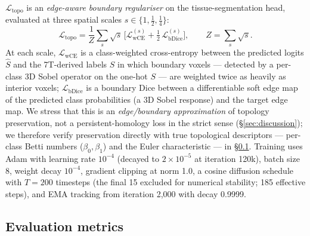 \documentclass[10pt,twocolumn,a4paper]{article}
\begin{document}
$\mathcal{L}_\text{topo}$ is an \emph{edge-aware boundary regulariser}
on the tissue-segmentation head, evaluated at three spatial scales
$s\in\{1,\tfrac12,\tfrac14\}$:
%
\begin{equation}
\mathcal{L}_\text{topo} = \frac{1}{Z}\sum_{s}\sqrt{s}\,\Big[\mathcal{L}_\text{wCE}^{(s)} + \tfrac12\,\mathcal{L}_\text{bDice}^{(s)}\Big],\qquad Z=\sum_{s}\sqrt{s}.
\end{equation}
%
At each scale, $\mathcal{L}_\text{wCE}$ is a class-weighted cross-entropy
between the predicted logits $\hat S$ and the 7T-derived labels $S$ in
which boundary voxels --- detected by a per-class 3D Sobel operator on
the one-hot $S$ --- are weighted twice as heavily as interior voxels;
$\mathcal{L}_\text{bDice}$ is a boundary Dice between a differentiable
soft edge map of the predicted class probabilities (a 3D Sobel response)
and the target edge map. We stress that this is an \emph{edge/boundary
approximation} of topology preservation, not a persistent-homology loss
in the strict sense (\S\ref{sec:discussion}); we therefore verify
preservation directly with true topological descriptors --- per-class
Betti numbers ($\beta_0,\beta_1$) and the Euler characteristic --- in
\S\ref{sec:metrics}. Training uses Adam \cite{kingma2014adam} with
learning rate $10^{-4}$ (decayed to $2\times10^{-5}$ at iteration 120k),
batch size 8, weight decay $10^{-4}$, gradient clipping at norm 1.0, a
cosine diffusion schedule with $T=200$ timesteps (the final 15 excluded
for numerical stability; 185 effective steps), and EMA tracking from
iteration 2{,}000 with decay 0.9999.

\subsection{Evaluation metrics}
\label{sec:metrics}
\end{document}
